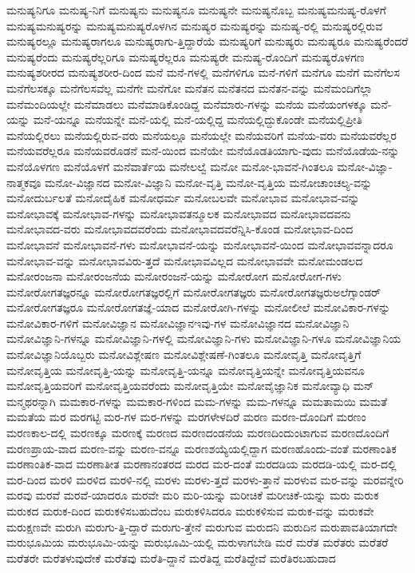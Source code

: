 {ಮನುಷ್ಯನಿಗೂ
ಮನುಷ್ಯ-ನಿಗೆ
ಮನುಷ್ಯನು
ಮನುಷ್ಯನೂ
ಮನುಷ್ಯನೇ
ಮನುಷ್ಯನೊಬ್ಬ
ಮನುಷ್ಯಮನುಷ್ಯ-ರೊಳಗೆ
ಮನುಷ್ಯಮನುಷ್ಯರನ್ನು
ಮನುಷ್ಯಮನುಷ್ಯರೊಳಗಿನ
ಮನುಷ್ಯರ
ಮನುಷ್ಯರನ್ನು
ಮನುಷ್ಯ-ರಲ್ಲಿ
ಮನುಷ್ಯರಲ್ಲಿರುವ
ಮನುಷ್ಯರಲ್ಲೂ
ಮನುಷ್ಯರಾಗಲೂ
ಮನುಷ್ಯರಾಗು-ತ್ತಿದ್ದಾರೆಯೆ
ಮನುಷ್ಯರಿಗೆ
ಮನುಷ್ಯರು
ಮನುಷ್ಯರೂ
ಮನುಷ್ಯರೆಂದರೆ
ಮನುಷ್ಯರೆಂದು
ಮನುಷ್ಯರೆಲ್ಲರಿಗೂ
ಮನುಷ್ಯರೆಲ್ಲರೂ
ಮನುಷ್ಯರೇ
ಮನುಷ್ಯ-ರೊಂದಿಗೆ
ಮನುಷ್ಯರೊಳಗಣ
ಮನುಷ್ಯಶರೀರದ
ಮನುಷ್ಯಶರೀರ-ದಿಂದ
ಮನೆ
ಮನೆ-ಗಳಲ್ಲಿ
ಮನೆಗಳಿಗೂ
ಮನೆ-ಗಳಿಗೆ
ಮನೆಗೂ
ಮನೆಗೆ
ಮನೆಗೆಲಸ
ಮನೆಗೆಲಸಕ್ಕೂ
ಮನೆಗೆಲಸವೆಲ್ಲ
ಮನೆಗೇ
ಮನೆಗೋ
ಮನೆತನ
ಮನೆತನದ
ಮನೆತನ-ವನ್ನು
ಮನೆಮಂದಿಗೆಲ್ಲಾ
ಮನೆಮಂದಿಯಲ್ಲೇ
ಮನೆಮಾಡಲು
ಮನೆಮಾಡಿಕೊಂಡಿದ್ದ
ಮನೆಮಾರು-ಗಳನ್ನು
ಮನೆಯ
ಮನೆಯಂಗಳಕ್ಕೂ
ಮನೆ-ಯನ್ನು
ಮನೆ-ಯನ್ನೂ
ಮನೆಯನ್ನೇ
ಮನೆ-ಯಲ್ಲಿ
ಮನೆ-ಯಲ್ಲಿದ್ದ
ಮನೆಯಲ್ಲಿದ್ದುಕೊಂಡೇ
ಮನೆಯಲ್ಲಿಪ್ರೀತಿ
ಮನೆಯಲ್ಲಿರಲು
ಮನೆಯಲ್ಲಿರುವ-ವರು
ಮನೆಯಲ್ಲೂ
ಮನೆಯಲ್ಲೇ
ಮನೆಯವರಿಗೆ
ಮನೆಯ-ವರು
ಮನೆಯವರೆಲ್ಲರ
ಮನೆಯವರೆಲ್ಲರೂ
ಮನೆಯವರೊಡನೆ
ಮನೆ-ಯಿಂದ
ಮನೆಯೇ
ಮನೆಯೊಡತಿಯಾಗು-ವುದು
ಮನೆಯೊಡೆಯ-ನನ್ನು
ಮನೆಯೊಳಗಣ
ಮನೆಯೊಳಗೆ
ಮನೆವಾರ್ತೆಯ
ಮನೇಲಲ್ವೆ
ಮನೋ
ಮನೋ-ಭಾವನೆ-ಗಿಂತಲೂ
ಮನೋ-ವಿಜ್ಞಾ-ನಾತ್ಮಕವೂ
ಮನೋ-ವಿಜ್ಞಾನದ
ಮನೋ-ವಿಜ್ಞಾನಿ
ಮನೋ-ವೃತ್ತಿ
ಮನೋ-ವೃತ್ತಿಯ
ಮನೋಚಾಂಚಲ್ಯ-ವನ್ನು
ಮನೋದುರ್ಬಲತೆ
ಮನೋದೈಹಿಕ
ಮನೋಧರ್ಮ
ಮನೋಬಲವೇ
ಮನೋಭಾವ
ಮನೋಭಾವ-ವನ್ನು
ಮನೋಭಾವಕ್ಕೆ
ಮನೋಭಾವ-ಗಳನ್ನು
ಮನೋಭಾವತನ್ಮೂಲಕ
ಮನೋಭಾವದ
ಮನೋಭಾವದವನು
ಮನೋಭಾವದ-ವರು
ಮನೋಭಾವದವರೆಂದು
ಮನೋಭಾವದವರೆನ್ನಿಸಿ-ಕೊಂಡ
ಮನೋಭಾವ-ದಿಂದ
ಮನೋಭಾವನೆ
ಮನೋಭಾವನೆ-ಗಳು
ಮನೋಭಾವನೆ-ಯನ್ನು
ಮನೋಭಾವನೆ-ಯಿಂದ
ಮನೋಭಾವವನ್ನಾದರೂ
ಮನೋಭಾವ-ವನ್ನು
ಮನೋಭಾವವಿರು-ತ್ತದೆ
ಮನೋಭಾವವಿಲ್ಲದ
ಮನೋಭಾವವೇ
ಮನೋಮಂಡಲದ
ಮನೋರಂಜನಾ
ಮನೋರಂಜನೆಯ
ಮನೋರಂಜನೆ-ಯನ್ನು
ಮನೋರೋಗ
ಮನೋರೋಗ-ಗಳು
ಮನೋರೋಗತಜ್ಞರನ್ನೂ
ಮನೋರೋಗತಜ್ಞರಲ್ಲಿಗೆ
ಮನೋರೋಗತಜ್ಞರು
ಮನೋರೋಗತಜ್ಞರುಅಲೆಗ್ಸಾಂಡರ್
ಮನೋರೋಗತಜ್ಞರೂ
ಮನೋರೋಗತಜ್ಞೆ-ಯಾದ
ಮನೋರೋಗಿ-ಗಳನ್ನು
ಮನೋಲೀಲೆ
ಮನೋವಿಕಾರ-ಗಳನ್ನು
ಮನೋವಿಕಾರ-ಗಳಿಗೆ
ಮನೋವಿಜ್ಞಾನ
ಮನೋವಿಜ್ಞಾನಇವು-ಗಳ
ಮನೋವಿಜ್ಞಾನದ
ಮನೋವಿಜ್ಞಾನಿ
ಮನೋವಿಜ್ಞಾನಿ-ಗಳನ್ನೂ
ಮನೋವಿಜ್ಞಾನಿ-ಗಳಲ್ಲಿ
ಮನೋವಿಜ್ಞಾನಿ-ಗಳು
ಮನೋವಿಜ್ಞಾನಿ-ಗಳೂ
ಮನೋವಿಜ್ಞಾನಿಯ
ಮನೋವಿಜ್ಞಾನಿಯೊಬ್ಬರು
ಮನೋವಿಶ್ಲೇಷಣ
ಮನೋವಿಶ್ಲೇಷಣೆ-ಗಿಂತಲೂ
ಮನೋವೃತ್ತಿ
ಮನೋವೃತ್ತಿಗೆ
ಮನೋವೃತ್ತಿಯ
ಮನೋವೃತ್ತಿ-ಯನ್ನು
ಮನೋವೃತ್ತಿ-ಯನ್ನೂ
ಮನೋವೃತ್ತಿಯನ್ನೇ
ಮನೋವೃತ್ತಿಯವನೂ
ಮನೋವೃತ್ತಿಯವರಿಗೆ
ಮನೋವೃತ್ತಿಯವರೆಂದು
ಮನೋವೃತ್ತಿಯೇ
ಮನೋವೈಜ್ಞಾನಿಕ
ಮನೋವ್ಯಾಧಿ
ಮನ್
ಮನ್ಮಥರನ್ನಾಗಿ
ಮಮಕಾರ-ಗಳನ್ನು
ಮಮಕಾರ-ಗಳಿಂದ
ಮಮ-ಗಳನ್ನು
ಮಮ-ಗಳನ್ನೂ
ಮಮತಾಮಯಿ
ಮಮತೆ
ಮಮತೆಯ
ಮರ
ಮರಗಟ್ಟಿ
ಮರ-ಗಳ
ಮರ-ಗಳನ್ನು
ಮರಗಳೇಳದಿರೆ
ಮರಣ
ಮರಣ-ದೊಂದಿಗೆ
ಮರಣಂ
ಮರಣಕಾಲ-ದಲ್ಲಿ
ಮರಣಕ್ಕೂ
ಮರಣಕ್ಕೆ
ಮರಣದ
ಮರಣದಂಡನೆಯ
ಮರಣದಿಂದುಂಟಾಗುವ
ಮರಣದೊಂದಿಗೆ
ಮರಣಪ್ರಾಯ-ವಾದ
ಮರಣ-ವನ್ನು
ಮರಣ-ವನ್ನೂ
ಮರಣಶಯ್ಯೆಯಲ್ಲಿದ್ದಾಗ
ಮರಣಹೊಂದು-ವಂತೆ
ಮರಣಾಂತಿಕ
ಮರಣಾಂತಿಕ-ವಾದ
ಮರಣಾತೀತ
ಮರಣಾನಂತರದ
ಮರದ
ಮರ-ದಂತೆ
ಮರದಡಿಯ
ಮರದಡಿ-ಯಲ್ಲಿ
ಮರ-ದಲ್ಲಿ
ಮರ-ದಿಂದ
ಮರಳಿ
ಮರಳಿದ
ಮರಳಿ-ನಲ್ಲಿ
ಮರಳು
ಮರಳು-ತ್ತದೆ
ಮರಳು-ತ್ತಾನೆ
ಮರಳುವ
ಮರ-ವನ್ನು
ಮರವನ್ನೇರಿ
ಮರವು
ಮರವೆ
ಮರವೆ-ಯಾದರೂ
ಮರವೇ
ಮರಿ
ಮರಿ-ಯನ್ನು
ಮರೀಚಿಕೆ
ಮರೀಚಿಕೆ-ಯನ್ನು
ಮರು
ಮರುಕ
ಮರುಕದ
ಮರುಕ-ದಿಂದ
ಮರುಕಳಿಸಬಹುದೆಂಬ
ಮರುಕಳಿಸಿದರೂ
ಮರುಕಳಿಸುವ
ಮರುಕ-ವನ್ನು
ಮರುಕವೇ
ಮರುಕ್ಷಣವೇ
ಮರುಗಿ
ಮರುಗು-ತ್ತಿ-ದ್ದಾರೆ
ಮರುಗು-ತ್ತೇನೆ
ಮರುಗುವ
ಮರುದನಿ
ಮರುದಿನ
ಮರುಪಾವತಿಯಾಗದೇ
ಮರುಭೂಮಿಯ
ಮರುಭೂಮಿ-ಯನ್ನು
ಮರುಭೂಮಿ-ಯಲ್ಲಿ
ಮರುಳಾಗಬೇಡಿ
ಮರೆ
ಮರೆತ
ಮರೆತರು
ಮರೆತರೆ
ಮರೆತರೇ
ಮರೆತಳುವುದೇಕೆ
ಮರೆತವು
ಮರೆತಿ-ದ್ದಾನೆ
ಮರೆತಿದ್ದ
ಮರೆತಿದ್ದೇವೆ
ಮರೆತಿರಬಹುದಾದ
}

